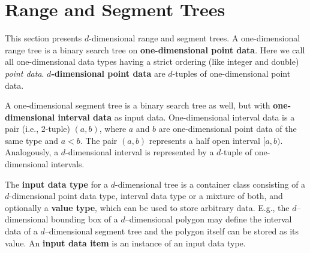 
%
%
%
%
%
\section{Range and Segment Trees\label{User:s-rangesegment}}

This section presents $d$-dimensional range and segment trees.
A one-dimensional range tree is a binary search tree on 
{\bf{one-dimensional point data}}. 
Here we call all one-dimensional data types having a strict ordering
(like integer and double) {\em point data}. 
{\bf{$d$-dimensional point data}} are $d$-tuples of one-dimensional 
point data.

A one-dimensional segment tree is a binary search tree as well, but with
{\bf{one-dimensional interval data}} as input data.
One-dimensional interval data is a pair (i.e., 2-tuple) $(a,b)$, where $a$ 
and $b$ are one-dimensional point data of the same type and $a< b$. 
The pair $(a,b)$ represents a half open interval $[a,b)$.
Analogously, a $d$-dimensional interval  is represented by a $d$-tuple of
one-dimensional intervals.

The {\bf{input data type}} for a $d$-dimensional tree is a container 
class consisting of a $d$-dimensional point data type, interval data type 
or a mixture of both, and optionally a {\bf{value type}}, which 
can be used to store arbitrary data. 
E.g., the $d$--dimensional bounding box of a $d$--dimensional polygon 
may define the interval data of a $d$--dimensional segment tree and
the polygon itself can be stored as its value.   
An {\bf{input data item}} is an instance of an input data type.

